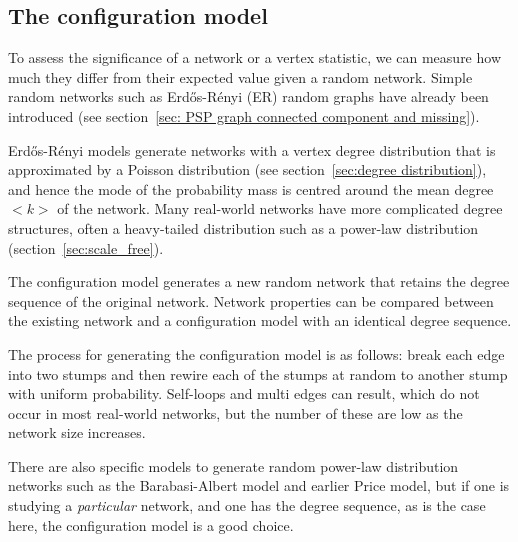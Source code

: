 
 

\subsection{The configuration model}
\label{sec:configuration model}
To assess the significance of a network or a vertex statistic, we can measure how much they differ from their expected value given a random network. Simple random networks such as Erd\H{o}s-R\'enyi (ER) random graphs have already been introduced (see section~\ref{sec: PSP graph connected component and missing}).

Erd\H{o}s-R\'enyi models generate networks with a vertex degree distribution that is approximated by a Poisson distribution (see section~\ref{sec:degree distribution}), and hence the mode of the probability mass is centred around the mean degree $<k>$ of the network.
Many real-world networks have more complicated degree structures, often a heavy-tailed distribution such as a power-law distribution (section~\ref{sec:scale_free}).

The configuration model generates a new random network that retains the degree sequence of the original network. Network properties can be compared between the existing network and a configuration model with an identical degree sequence.

 The process for generating the configuration model is as follows: break each edge into two stumps and then rewire each of the stumps at random to another stump with uniform probability.  Self-loops and multi edges can result, which do not occur in most real-world networks, but the number of these are low as the network size increases\cite{newman2018networks}.

There are also specific models to generate random power-law distribution networks such as the Barabasi-Albert model\cite{barabasi1999emergence} and earlier Price model\cite{price1965networks}, but if one is studying a \textit{particular} network, and one has the degree sequence, as is the case here, the configuration model is a good choice\cite{newman2018networks}.


